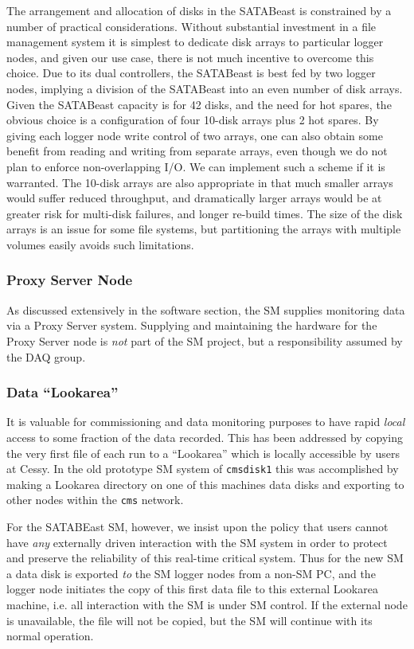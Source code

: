 The arrangement and allocation of disks in the SATABeast is constrained by a number
of practical considerations.
Without substantial investment in a file management system it is simplest
to dedicate disk arrays to particular logger nodes, and given our use case, 
there is not much incentive to overcome this choice.
Due to its dual controllers, the SATABeast is best fed by two logger nodes,
implying a division of the SATABeast into an even number of disk arrays.
Given the  SATABeast capacity is for 42 disks, and the need for hot spares, 
the obvious choice is a configuration of four 10-disk arrays plus 2 hot spares.
By giving each logger node write control of two arrays, one can also obtain some benefit
from reading and writing from separate arrays, even though we do not plan
to enforce non-overlapping I/O. We can implement such a scheme if it is warranted.
The 10-disk arrays are also appropriate in that much smaller arrays would
suffer reduced throughput, and dramatically larger arrays would be at greater
risk for multi-disk failures, and longer re-build times.
The size of the disk arrays is an issue for some file systems, 
but partitioning the arrays with multiple volumes easily avoids such limitations.
 
\subsubsection{Proxy Server Node}

As discussed extensively in the software section, the SM supplies monitoring
data via a Proxy Server system.
Supplying and maintaining the hardware for the Proxy Server node 
is {\it not} part of the SM project, but a responsibility assumed by the DAQ group.


\subsubsection{Data ``Lookarea''}

It is valuable for commissioning and data monitoring purposes to have rapid
{\it local} access to some fraction of the data recorded.
This has been addressed by copying the very first file of each run 
to a ``Lookarea'' which is locally accessible by users at Cessy.
In the old prototype SM system of  \verb+cmsdisk1+ this was accomplished
by making a Lookarea directory on one of this machines data disks and
exporting to other nodes within the \verb+cms+ network.


For the SATABEast SM, however, we insist upon the policy that users
cannot have {\it any} externally driven interaction with the SM system
in order to protect and preserve the reliability of this real-time critical system.
Thus for the new SM a data disk is exported {\it to} the SM logger nodes
from a non-SM PC, and
the logger node initiates the copy of this first data file to this
external Lookarea machine, i.e. all interaction with the SM is under
SM control.
If the external node is unavailable, the file will not be copied, but
the SM will continue with its normal operation.

